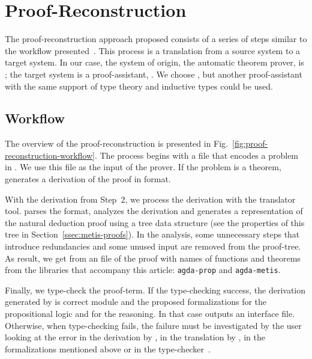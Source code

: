\documentclass[../main.tex]{subfiles}
\begin{document}

\section{Proof-Reconstruction}
\label{sec:proof-reconstruction}

The proof-reconstruction approach proposed consists of a series of
steps similar to the workflow presented~\cite{sultana2015}.  This
process is a translation from a source system to a target system. In
our case, the system of origin, the automatic theorem prover, is
\Metis; the target system is a proof-assistant, \Agda. We choose
\Agda, but another proof-assistant with the same support of type
theory and inductive types could be used.

\subsection{Workflow}
\label{ssec:workflow}


The overview of the proof-reconstruction is presented in
Fig.~\ref{fig:proof-reconstruction-workflow}. The process begins with
a \TPTP file that encodes a problem in \CPL. We use this file as the
input of the \Metis prover. If the problem is a theorem, \Metis
generates a derivation of the proof in \TSTP format.

With the \TSTP derivation from Step~2, we process the derivation with the
\Athena translator tool.
\Athena parses the \TSTP format, analyzes the
derivation and generates a representation of the natural deduction
proof using a tree data structure (see the properties
of this tree in Section~\ref{ssec:metis-proofs}).
In the \Athena analysis, some unnecessary steps that introduce redundancies
and some unused input are removed from the proof-tree.
As result, we get from \Athena an \Agda file of the proof
with names of functions and theorems from
the \Agda libraries that accompany this article:
\texttt{agda-prop} and \texttt{agda-metis}.

Finally, we type-check the \Agda proof-term. If the type-checking
success, the \TSTP derivation generated by \Metis is correct
module \Agda and the proposed formalizations for the
propositional logic and for the \Metis reasoning.
In that case \Agda outputs an interface file.
Otherwise, when type-checking fails, the failure must be
investigated by the user looking at the error in the \TSTP derivation
by \Metis, in the translation by \Athena, in the \Agda formalizations
mentioned above or in the type-checker~\Agda.
\end{document}
